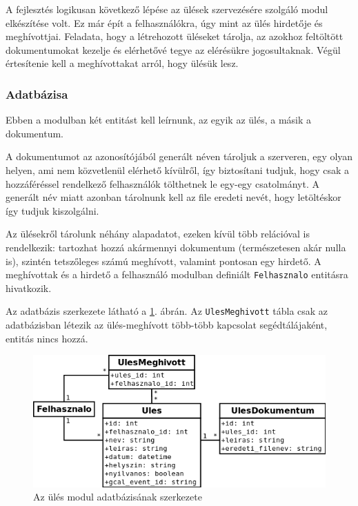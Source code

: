 \documentclass[a4paper,12pt,oneside]{report}
\begin{document}
A fejlesztés logikusan következő lépése az ülések szervezésére szolgáló modul elkészítése volt. Ez már épít a felhasználókra, úgy mint az ülés hirdetője és meghívottjai. Feladata, hogy a létrehozott üléseket tárolja, az azokhoz feltöltött dokumentumokat kezelje és elérhetővé tegye az elérésükre jogosultaknak. Végül értesítenie kell a meghívottakat arról, hogy ülésük lesz.

\subsubsection*{Adatbázisa}

Ebben a modulban két entitást kell leírnunk, az egyik az ülés, a másik a dokumentum.

A dokumentumot az azonosítójából generált néven tároljuk a szerveren, egy olyan helyen, ami nem közvetlenül elérhető kívülről, így biztosítani tudjuk, hogy csak a hozzáféréssel rendelkező felhasználók tölthetnek le egy-egy csatolmányt. A generált név miatt azonban tárolnunk kell az file eredeti nevét, hogy letöltéskor így tudjuk kiszolgálni.

Az ülésekről tárolunk néhány alapadatot, ezeken kívül több relációval is rendelkezik: tartozhat hozzá akármennyi dokumentum (természetesen akár nulla is), szintén tetszőleges számú meghívott, valamint pontosan egy hirdető. A meghívottak és a hirdető a felhasználó modulban definiált {\tt Felhasznalo} entitásra hivatkozik.

Az adatbázis szerkezete látható a \ref{fig:ules_db}. ábrán. Az {\tt UlesMeghivott} tábla csak az adatbázisban létezik az ülés-meghívott több-több kapcsolat segédtálájaként, entitás nincs hozzá.

\begin{figure}[h]
    \includegraphics[width=\textwidth]{ules_db.png}
    \caption{Az ülés modul adatbázisának szerkezete}
    \label{fig:ules_db}
\end{figure}
\end{document}
